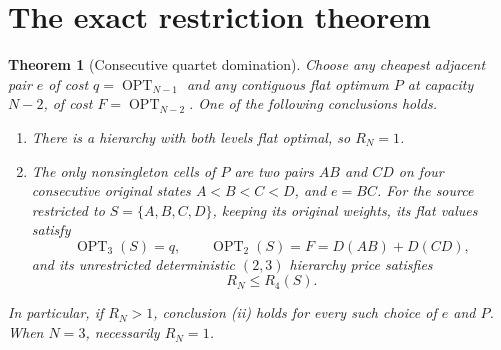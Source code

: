 \documentclass[11pt]{article}
\newtheorem{theorem}{Theorem}
\theoremstyle{remark}\newtheorem{remark}[theorem]{Remark}
\newcommand{\OPT}{\operatorname{OPT}}
\begin{document}
\section{The exact restriction theorem}

\begin{theorem}[Consecutive quartet domination]
\label{thm:reduction}
Choose any cheapest adjacent pair $e$ of cost $q=\OPT_{N-1}$ and any
contiguous flat optimum $P$ at capacity $N-2$, of cost $F=\OPT_{N-2}$.
One of the following conclusions holds.
\begin{enumerate}[label=\textup{(\roman*)}]
\item There is a hierarchy with both levels flat optimal, so $R_N=1$.
\item The only nonsingleton cells of $P$ are two pairs $AB$ and $CD$ on
four consecutive original states $A<B<C<D$, and $e=BC$. For the source
restricted to $S=\{A,B,C,D\}$, keeping its original weights, its flat
values satisfy
\[
 \OPT_3(S)=q,\qquad \OPT_2(S)=F=D(AB)+D(CD),
\]
and its unrestricted deterministic $(2,3)$ hierarchy price satisfies
\[
 R_N\le R_4(S).
\]
\end{enumerate}
In particular, if $R_N>1$, conclusion \textup{(ii)} holds for every such
choice of $e$ and $P$. When $N=3$, necessarily $R_N=1$.
\end{theorem}
\end{document}
